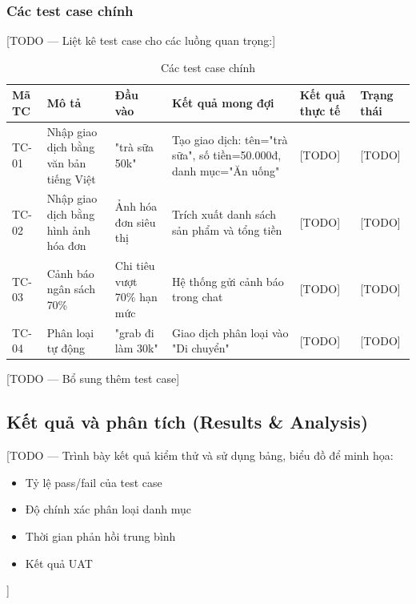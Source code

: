 \subsubsection{Các test case chính}

[TODO --- Liệt kê test case cho các luồng quan trọng:]

\begin{table}[htbp]
\centering
\begin{tabularx}{\textwidth}{|l|p{3.5cm}|X|p{2cm}|p{2cm}|p{1.5cm}|}
\hline
\textbf{Mã TC} & \textbf{Mô tả} & \textbf{Đầu vào} & \textbf{Kết quả mong đợi} & \textbf{Kết quả thực tế} & \textbf{Trạng thái} \\ \hline
TC-01 & Nhập giao dịch bằng văn bản tiếng Việt & "trà sữa 50k" & Tạo giao dịch: tên="trà sữa", số tiền=50.000đ, danh mục="Ăn uống" & [TODO] & [TODO] \\ \hline
TC-02 & Nhập giao dịch bằng hình ảnh hóa đơn & Ảnh hóa đơn siêu thị & Trích xuất danh sách sản phẩm và tổng tiền & [TODO] & [TODO] \\ \hline
TC-03 & Cảnh báo ngân sách 70\% & Chi tiêu vượt 70\% hạn mức & Hệ thống gửi cảnh báo trong chat & [TODO] & [TODO] \\ \hline
TC-04 & Phân loại tự động & "grab đi làm 30k" & Giao dịch phân loại vào "Di chuyển" & [TODO] & [TODO] \\ \hline
\end{tabularx}
\caption{Các test case chính}
\label{tab:test_cases}
\end{table}

[TODO --- Bổ sung thêm test case]

\subsection{Kết quả và phân tích (Results \& Analysis)}
\label{subsec:test_results}

[TODO --- Trình bày kết quả kiểm thử và sử dụng bảng, biểu đồ để minh họa:
\begin{itemize}
    \item Tỷ lệ pass/fail của test case
    \item Độ chính xác phân loại danh mục
    \item Thời gian phản hồi trung bình
    \item Kết quả UAT
\end{itemize}
]
